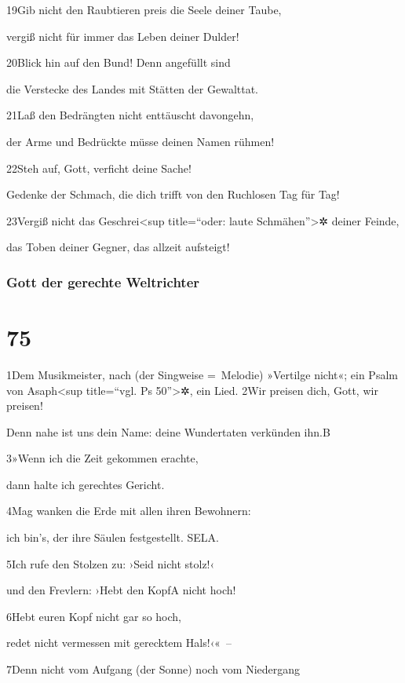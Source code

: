 19Gib nicht den Raubtieren preis die Seele deiner Taube,

vergiß nicht für immer das Leben deiner Dulder!

20Blick hin auf den Bund! Denn angefüllt sind

die Verstecke des Landes mit Stätten der Gewalttat.

21Laß den Bedrängten nicht enttäuscht davongehn,

der Arme und Bedrückte müsse deinen Namen rühmen!

22Steh auf, Gott, verficht deine Sache!

Gedenke der Schmach, die dich trifft von den Ruchlosen Tag für Tag!

23Vergiß nicht das Geschrei\textless sup title=``oder: laute
Schmähen''\textgreater✲ deiner Feinde,

das Toben deiner Gegner, das allzeit aufsteigt!

\hypertarget{gott-der-gerechte-weltrichter}{%
\subsubsection{Gott der gerechte
Weltrichter}\label{gott-der-gerechte-weltrichter}}

\hypertarget{section-74}{%
\section{75}\label{section-74}}

1Dem Musikmeister, nach (der Singweise =~Melodie) »Vertilge nicht«; ein
Psalm von Asaph\textless sup title=``vgl. Ps 50''\textgreater✲, ein
Lied. 2Wir preisen dich, Gott, wir preisen!

Denn nahe ist uns dein Name: deine Wundertaten verkünden ihn.{B}

3»Wenn ich die Zeit gekommen erachte,

dann halte ich gerechtes Gericht.

4Mag wanken die Erde mit allen ihren Bewohnern:

ich bin's, der ihre Säulen festgestellt. SELA.

5Ich rufe den Stolzen zu: ›Seid nicht stolz!‹

und den Frevlern: ›Hebt den Kopf{A} nicht hoch!

6Hebt euren Kopf nicht gar so hoch,

redet nicht vermessen mit gerecktem Hals!‹«~--

7Denn nicht vom Aufgang (der Sonne) noch vom Niedergang

